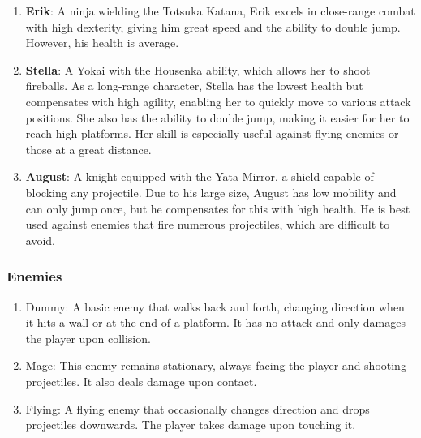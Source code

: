 \begin{enumerate}[label=\textbullet]
    \item \textbf{Erik}: A ninja wielding the Totsuka Katana, Erik excels in close-range combat with high dexterity, giving him great speed and the ability to double jump. However, his health is average. \cite{erik}
    
    \item \textbf{Stella}: A Yokai with the Housenka ability, which allows her to shoot fireballs. As a long-range character, Stella has the lowest health but compensates with high agility, enabling her to quickly move to various attack positions. She also has the ability to double jump, making it easier for her to reach high platforms. Her skill is especially useful against flying enemies or those at a great distance. \cite{stella}
    
    \item \textbf{August}: A knight equipped with the Yata Mirror, a shield capable of blocking any projectile. Due to his large size, August has low mobility and can only jump once, but he compensates for this with high health. He is best used against enemies that fire numerous projectiles, which are difficult to avoid. \cite{august}
\end{enumerate}

\subsubsection{Enemies}
\begin{enumerate}[label=\textbullet]
    \item Dummy: A basic enemy that walks back and forth, changing direction when it hits a wall or at the end of a platform. It has no attack and only damages the player upon collision. \cite{dummy}
    
    \item Mage: This enemy remains stationary, always facing the player and shooting projectiles. It also deals damage upon contact. \cite{mage}
    
    \item Flying: A flying enemy that occasionally changes direction and drops projectiles downwards. The player takes damage upon touching it. \cite{flying}
\end{enumerate}

